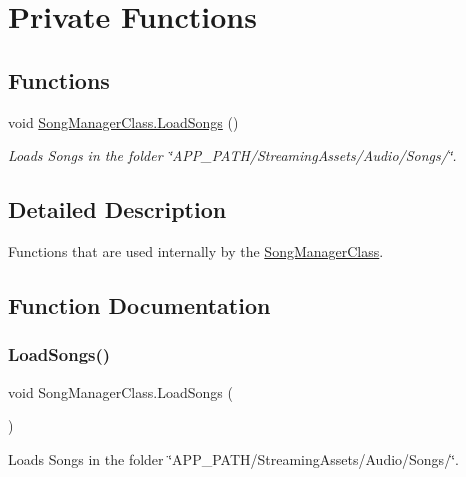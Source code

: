 \hypertarget{group___s_m_priv_func}{}\section{Private Functions}
\label{group___s_m_priv_func}
\subsection*{Functions}
\begin{DoxyCompactItemize}
\item 
void \hyperlink{group___s_m_priv_func_ga73d6d3b38a160fd73b63b786b9cd384a}{Song\+Manager\+Class.\+Load\+Songs} ()
\begin{DoxyCompactList}\small\item\em Loads Songs in the folder \char`\"{}\+A\+P\+P\+\_\+\+P\+A\+T\+H/\+Streaming\+Assets/\+Audio/\+Songs/\char`\"{}. \end{DoxyCompactList}\end{DoxyCompactItemize}


\subsection{Detailed Description}
Functions that are used internally by the \hyperlink{class_song_manager_class}{Song\+Manager\+Class}. 

\subsection{Function Documentation}
\mbox{\label{group___s_m_priv_func_ga73d6d3b38a160fd73b63b786b9cd384a}} 
\subsubsection{\texorpdfstring{Load\+Songs()}{LoadSongs()}}
{\footnotesize\ttfamily void Song\+Manager\+Class.\+Load\+Songs (\begin{DoxyParamCaption}{ }\end{DoxyParamCaption})\hspace{0.3cm}{\ttfamily [private]}}



Loads Songs in the folder \char`\"{}\+A\+P\+P\+\_\+\+P\+A\+T\+H/\+Streaming\+Assets/\+Audio/\+Songs/\char`\"{}. 

